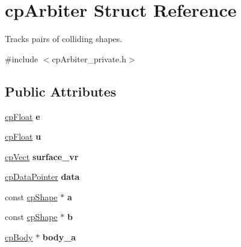 \hypertarget{structcp_arbiter}{}\section{cp\+Arbiter Struct Reference}
\label{structcp_arbiter}


Tracks pairs of colliding shapes.  




{\ttfamily \#include $<$cp\+Arbiter\+\_\+private.\+h$>$}

\subsection*{Public Attributes}
\begin{DoxyCompactItemize}
\item 
\hypertarget{structcp_arbiter_ae28e688fb03eba42a1dd786ab914c9eb}{}\hyperlink{group__basic_types_gac1ed65573e035bf892505768c852d8d3}{cp\+Float} {\bfseries e}\label{structcp_arbiter_ae28e688fb03eba42a1dd786ab914c9eb}

\item 
\hypertarget{structcp_arbiter_a1be4918be41986330005a6e745d013f3}{}\hyperlink{group__basic_types_gac1ed65573e035bf892505768c852d8d3}{cp\+Float} {\bfseries u}\label{structcp_arbiter_a1be4918be41986330005a6e745d013f3}

\item 
\hypertarget{structcp_arbiter_ad8724ab2c97ec732128fafc77668cc54}{}\hyperlink{structcp_vect}{cp\+Vect} {\bfseries surface\+\_\+vr}\label{structcp_arbiter_ad8724ab2c97ec732128fafc77668cc54}

\item 
\hypertarget{structcp_arbiter_afb41ae8c3e4df711f47ab7ac3ef7ed9a}{}\hyperlink{group__basic_types_ga2ac2c3c31e21893941f9e4f8ee279447}{cp\+Data\+Pointer} {\bfseries data}\label{structcp_arbiter_afb41ae8c3e4df711f47ab7ac3ef7ed9a}

\item 
\hypertarget{structcp_arbiter_a169358f50db550583803f105df13ae48}{}const \hyperlink{structcp_shape}{cp\+Shape} $\ast$ {\bfseries a}\label{structcp_arbiter_a169358f50db550583803f105df13ae48}

\item 
\hypertarget{structcp_arbiter_a0609639e649ef29acf5f5aaeb26d2036}{}const \hyperlink{structcp_shape}{cp\+Shape} $\ast$ {\bfseries b}\label{structcp_arbiter_a0609639e649ef29acf5f5aaeb26d2036}

\item 
\hypertarget{structcp_arbiter_a0e310136b1a4d5b46a374b35fcd49f62}{}\hyperlink{structcp_body}{cp\+Body} $\ast$ {\bfseries body\+\_\+a}\label{structcp_arbiter_a0e310136b1a4d5b46a374b35fcd49f62}


\end{DoxyCompactItemize}
